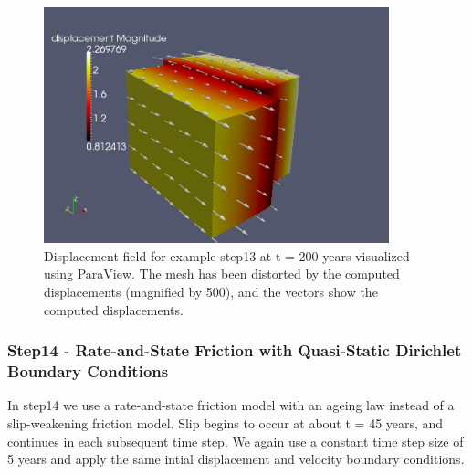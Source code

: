 \begin{figure}
  \includegraphics[width=10cm]{examples/figs/3dhex8_step13-displ-t200}
  \caption{Displacement field for example step13 at t = 200 years visualized
    using ParaView. The mesh has been distorted by the computed displacements
    (magnified by 500), and the vectors show the computed displacements.}
  \label{fig:example:3dhex8:step13:displacement}
\end{figure}


\subsubsection{Step14 - Rate-and-State Friction with Quasi-Static Dirichlet Boundary Conditions}

In step14 we use a rate-and-state friction model with an ageing law
instead of a slip-weakening friction model. Slip begins to occur at
about t = 45 years, and continues in each subsequent time step. We
again use a constant time step size of 5 years and apply the same
intial displacement and velocity boundary conditions.

